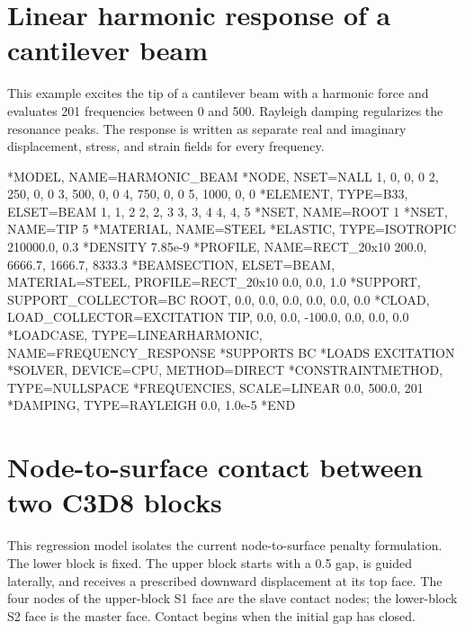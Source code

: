 \section{Linear harmonic response of a cantilever beam}

This example excites the tip of a cantilever beam with a harmonic force and evaluates 201 frequencies between 0 and 500. Rayleigh damping regularizes the resonance peaks. The response is written as separate real and imaginary displacement, stress, and strain fields for every frequency.

\begin{exampledeck}
*MODEL, NAME=HARMONIC_BEAM
*NODE, NSET=NALL
1, 0, 0, 0
2, 250, 0, 0
3, 500, 0, 0
4, 750, 0, 0
5, 1000, 0, 0
*ELEMENT, TYPE=B33, ELSET=BEAM
1, 1, 2
2, 2, 3
3, 3, 4
4, 4, 5
*NSET, NAME=ROOT
1
*NSET, NAME=TIP
5
*MATERIAL, NAME=STEEL
*ELASTIC, TYPE=ISOTROPIC
210000.0, 0.3
*DENSITY
7.85e-9
*PROFILE, NAME=RECT_20x10
200.0, 6666.7, 1666.7, 8333.3
*BEAMSECTION, ELSET=BEAM, MATERIAL=STEEL, PROFILE=RECT_20x10
0.0, 0.0, 1.0
*SUPPORT, SUPPORT_COLLECTOR=BC
ROOT, 0.0, 0.0, 0.0, 0.0, 0.0, 0.0
*CLOAD, LOAD_COLLECTOR=EXCITATION
TIP, 0.0, 0.0, -100.0, 0.0, 0.0, 0.0
*LOADCASE, TYPE=LINEARHARMONIC, NAME=FREQUENCY_RESPONSE
*SUPPORTS
BC
*LOADS
EXCITATION
*SOLVER, DEVICE=CPU, METHOD=DIRECT
*CONSTRAINTMETHOD, TYPE=NULLSPACE
*FREQUENCIES, SCALE=LINEAR
0.0, 500.0, 201
*DAMPING, TYPE=RAYLEIGH
0.0, 1.0e-5
*END
\end{exampledeck}

\section{Node-to-surface contact between two C3D8 blocks}

This regression model isolates the current node-to-surface penalty formulation. The lower block is fixed. The upper block starts with a 0.5 gap, is guided laterally, and receives a prescribed downward displacement at its top face. The four nodes of the upper-block S1 face are the slave contact nodes; the lower-block S2 face is the master face. Contact begins when the initial gap has closed.

